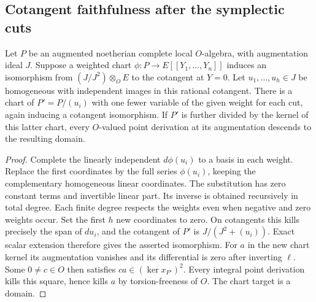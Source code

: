 \subsection{Cotangent faithfulness after the symplectic cuts}
\label{dp:cut}

\begin{lemma}\label{dp:cutlemma}
Let \(P\) be an augmented noetherian complete local \(O\)-algebra,
with augmentation ideal \(J\). Suppose a weighted chart
\(\phi:P\to E[[Y_1,\ldots,Y_n]]\) induces an isomorphism from
\((J/J^2)\otimes_O E\) to the cotangent at \(Y=0\).
Let \(u_1,\ldots,u_h\in J\) be homogeneous with independent images in
this rational cotangent. There is a chart of \(P'=P/(u_i)\) with
one fewer variable of the given weight for each cut, again inducing
a cotangent isomorphism. If \(P'\) is further divided by the kernel
of this latter chart, every \(O\)-valued point derivation at its
augmentation descends to the resulting domain.
\end{lemma}

\begin{proof}
Complete the linearly independent \(d\phi(u_i)\) to a basis in each
weight. Replace the first coordinates by the full series
\(\phi(u_i)\), keeping the complementary homogeneous linear
coordinates. The substitution has zero constant terms and invertible
linear part. Its inverse is obtained recursively in total degree.
Each finite degree respects the weights even when negative and zero
weights occur. Set the first \(h\) new coordinates to zero. On
cotangents this kills precisely the span of \(du_i\), and the
cotangent of \(P'\) is \(J/(J^2+(u_i))\). Exact scalar extension
therefore gives the asserted isomorphism. For \(a\) in the new
chart kernel its augmentation vanishes and its differential is zero
after inverting \(\ell\). Some \(0\ne c\in O\) then satisfies
\(ca\in(\ker x_{P'})^2\). Every integral point derivation kills this
square, hence kills \(a\) by torsion-freeness of \(O\). The chart
target is a domain.
\end{proof}

